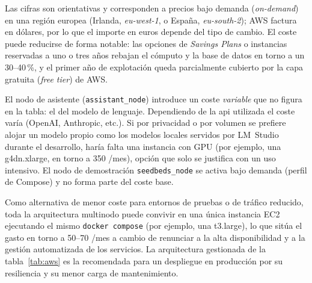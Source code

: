 Las cifras son orientativas y corresponden a precios bajo demanda
(\emph{on-demand}) en una región europea (Irlanda, \emph{eu-west-1}, o España, \emph{eu-south-2}); 
AWS factura en dólares, por lo que el importe en euros
depende del tipo de cambio. El coste puede reducirse de forma notable: las
opciones de \emph{Savings Plans} o instancias reservadas a uno o tres años
rebajan el cómputo y la base de datos en torno a un 30--40\,\%, y el primer año
de explotación queda parcialmente cubierto por la capa gratuita (\emph{free
tier}) de AWS.

El nodo de asistente (\texttt{assistant\_\allowbreak node}) introduce un coste
\emph{variable} que no figura en la tabla: el del modelo de lenguaje. Dependiendo
de la api utilizada el coste varía (OpenAI, Anthropic, etc.). Si por privacidad o 
por volumen se prefiere alojar un modelo propio como los modelos locales servidos 
por LM~Studio durante el desarrollo,
haría falta una instancia con GPU (por ejemplo, una g4dn.xlarge, en torno a
350 \texteuro{}/mes), opción que solo se justifica con un uso intensivo. El
nodo de demostración \texttt{seedbeds\_\allowbreak node} se activa bajo demanda
(perfil de Compose) y no forma parte del coste base.

Como alternativa de menor coste para entornos de pruebas o de tráfico reducido,
toda la arquitectura multinodo puede convivir en una única instancia EC2
ejecutando el mismo \texttt{docker compose} (por ejemplo, una t3.large), lo que
sitúa el gasto en torno a 50--70 \texteuro{}/mes a cambio de renunciar a la alta
disponibilidad y a la gestión automatizada de los servicios. La arquitectura
gestionada de la tabla~\ref{tab:aws} es la recomendada para un despliegue en
producción por su resiliencia y su menor carga de mantenimiento.
